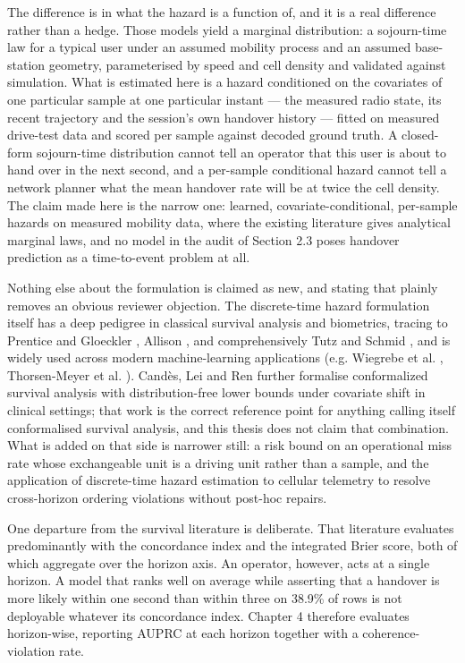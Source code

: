 The difference is in what the hazard is a function of, and it is a real difference rather than a hedge. Those models yield a marginal distribution: a sojourn-time law for a typical user under an assumed mobility process and an assumed base-station geometry, parameterised by speed and cell density and validated against simulation. What is estimated here is a hazard conditioned on the covariates of one particular sample at one particular instant --- the measured radio state, its recent trajectory and the session's own handover history --- fitted on measured drive-test data and scored per sample against decoded ground truth. A closed-form sojourn-time distribution cannot tell an operator that this user is about to hand over in the next second, and a per-sample conditional hazard cannot tell a network planner what the mean handover rate will be at twice the cell density. The claim made here is the narrow one: learned, covariate-conditional, per-sample hazards on measured mobility data, where the existing literature gives analytical marginal laws, and no model in the audit of Section 2.3 poses handover prediction as a time-to-event problem at all.

Nothing else about the formulation is claimed as new, and stating that plainly removes an obvious reviewer objection. The discrete-time hazard formulation itself has a deep pedigree in classical survival analysis and biometrics, tracing to Prentice and Gloeckler \cite{ref48}, Allison \cite{ref49}, and comprehensively Tutz and Schmid \cite{ref50}, and is widely used across modern machine-learning applications (e.g. Wiegrebe et al. \cite{ref16}, Thorsen-Meyer et al. \cite{ref17}). Cand\`es, Lei and Ren \cite{ref18} further formalise conformalized survival analysis with distribution-free lower bounds under covariate shift in clinical settings; that work is the correct reference point for anything calling itself conformalised survival analysis, and this thesis does not claim that combination. What is added on that side is narrower still: a risk bound on an operational miss rate whose exchangeable unit is a driving unit rather than a sample, and the application of discrete-time hazard estimation to cellular telemetry to resolve cross-horizon ordering violations without post-hoc repairs.

One departure from the survival literature is deliberate. That literature evaluates predominantly with the concordance index and the integrated Brier score, both of which aggregate over the horizon axis. An operator, however, acts at a single horizon. A model that ranks well on average while asserting that a handover is more likely within one second than within three on 38.9\% of rows is not deployable whatever its concordance index. Chapter 4 therefore evaluates horizon-wise, reporting AUPRC at each horizon together with a coherence-violation rate.


